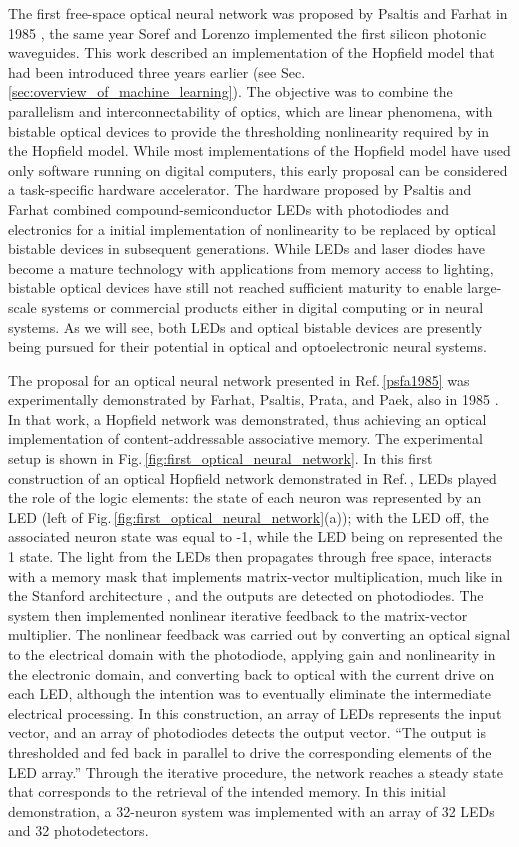 The first free-space optical neural network was proposed by Psaltis and Farhat in 1985 \cite{psfa1985}, the same year Soref and Lorenzo implemented the first silicon photonic waveguides. This work described an implementation of the Hopfield model that had been introduced three years earlier (see Sec.\,\ref{sec:overview_of_machine_learning}). The objective was to combine the parallelism and interconnectability of optics, which are linear phenomena, with bistable optical devices to provide the thresholding nonlinearity required by in the Hopfield model. While most implementations of the Hopfield model have used only software running on digital computers, this early proposal can be considered a task-specific hardware accelerator. The hardware proposed by Psaltis and Farhat combined compound-semiconductor LEDs with photodiodes and electronics for a initial implementation of nonlinearity to be replaced by optical bistable devices in subsequent generations. While LEDs and laser diodes have become a mature technology with applications from memory access to lighting, bistable optical devices have still not reached sufficient maturity to enable large-scale systems or commercial products either in digital computing or in neural systems. As we will see, both LEDs and optical bistable devices are presently being pursued for their potential in optical and optoelectronic neural systems.

The proposal for an optical neural network presented in Ref.\,\ref{psfa1985} was experimentally demonstrated by Farhat, Psaltis, Prata, and Paek, also in 1985 \cite{faps1985}. In that work, a Hopfield network was demonstrated, thus achieving an optical implementation of content-addressable associative memory. The experimental setup is shown in Fig.\,\ref{fig:first_optical_neural_network}. In this first construction of an optical Hopfield network demonstrated in Ref.\,\cite{faps1985}, LEDs played the role of the logic elements: the state of each neuron was represented by an LED (left of Fig.\,\ref{fig:first_optical_neural_network}(a)); with the LED off, the associated neuron state was equal to -1, while the LED being on represented the 1 state. The light from the LEDs then propagates through free space, interacts with a memory mask that implements matrix-vector multiplication, much like in the Stanford architecture \cite{godi1978}, and the outputs are detected on photodiodes. The system then implemented nonlinear iterative feedback to the matrix-vector multiplier. The nonlinear feedback was carried out by converting an optical signal to the electrical domain with the photodiode, applying gain and nonlinearity in the electronic domain, and converting back to optical with the current drive on each LED, although the intention was to eventually eliminate the intermediate electrical processing. In this construction, an array of LEDs represents the input vector, and an array of photodiodes detects the output vector. ``The output is thresholded and fed back in parallel to drive the corresponding elements of the LED array.'' Through the iterative procedure, the network reaches a steady state that corresponds to the retrieval of the intended memory. In this initial demonstration, a 32-neuron system was implemented with an array of 32 LEDs and 32 photodetectors. 

